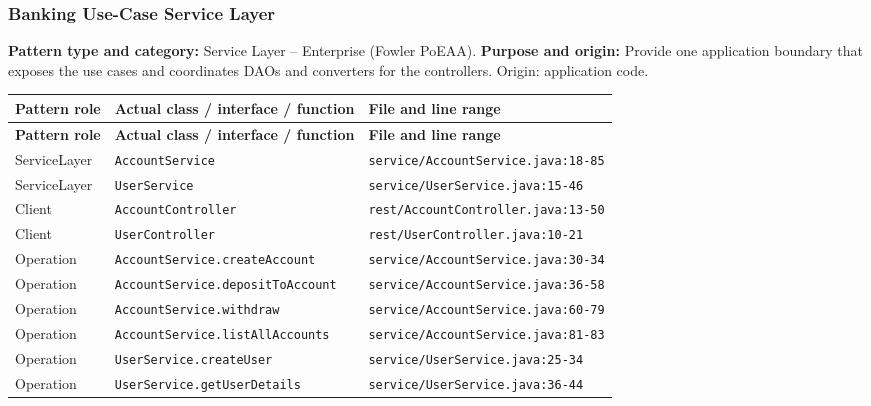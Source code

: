 \documentclass[11pt,a4paper]{article}
\begin{document}
\subsubsection{Banking Use-Case Service Layer}
\textbf{Pattern type and category:} Service Layer -- Enterprise (Fowler PoEAA). \textbf{Purpose and origin:} Provide one application boundary that exposes the use cases and coordinates DAOs and converters for the controllers. Origin: application code.
{\footnotesize
\begin{longtable}{@{}p{3.1cm}p{5.6cm}p{7cm}@{}}
\toprule \textbf{Pattern role} & \textbf{Actual class / interface / function} & \textbf{File and line range} \\ \midrule \endfirsthead
\toprule \textbf{Pattern role} & \textbf{Actual class / interface / function} & \textbf{File and line range} \\ \midrule \endhead
\bottomrule \endfoot
ServiceLayer & \texttt{AccountService} & \texttt{service/\allowbreak{}AccountService.\allowbreak{}java:\allowbreak{}18-85} \\
ServiceLayer & \texttt{UserService} & \texttt{service/\allowbreak{}UserService.\allowbreak{}java:\allowbreak{}15-46} \\
Client & \texttt{AccountController} & \texttt{rest/\allowbreak{}AccountController.\allowbreak{}java:\allowbreak{}13-50} \\
Client & \texttt{UserController} & \texttt{rest/\allowbreak{}UserController.\allowbreak{}java:\allowbreak{}10-21} \\
Operation & \texttt{AccountService.\allowbreak{}createAccount} & \texttt{service/\allowbreak{}AccountService.\allowbreak{}java:\allowbreak{}30-34} \\
Operation & \texttt{AccountService.\allowbreak{}depositToAccount} & \texttt{service/\allowbreak{}AccountService.\allowbreak{}java:\allowbreak{}36-58} \\
Operation & \texttt{AccountService.\allowbreak{}withdraw} & \texttt{service/\allowbreak{}AccountService.\allowbreak{}java:\allowbreak{}60-79} \\
Operation & \texttt{AccountService.\allowbreak{}listAllAccounts} & \texttt{service/\allowbreak{}AccountService.\allowbreak{}java:\allowbreak{}81-83} \\
Operation & \texttt{UserService.\allowbreak{}createUser} & \texttt{service/\allowbreak{}UserService.\allowbreak{}java:\allowbreak{}25-34} \\
Operation & \texttt{UserService.\allowbreak{}getUserDetails} & \texttt{service/\allowbreak{}UserService.\allowbreak{}java:\allowbreak{}36-44} \\

\end{longtable}}
\end{document}
